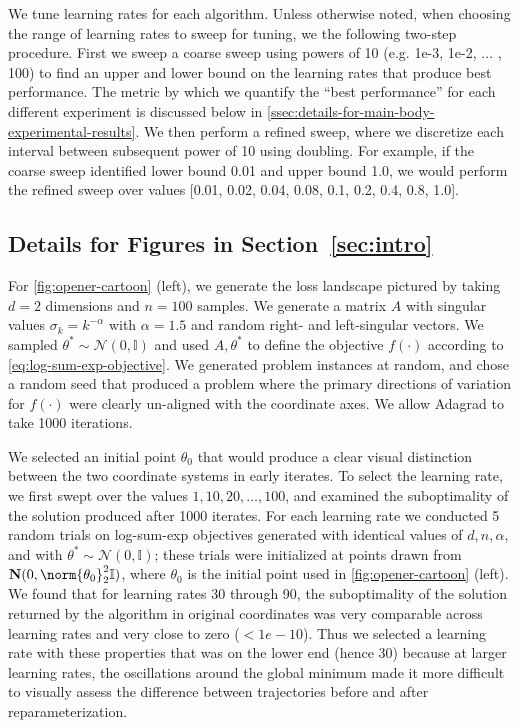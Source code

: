 We tune learning rates for each algorithm. Unless otherwise noted, when choosing the range of learning rates to sweep for tuning, we the following two-step procedure. First we sweep a coarse sweep using powers of 10 (e.g. 1e-3, 1e-2, $\dots$ , 100) to find an upper and lower bound on the learning rates that produce best performance. The metric by which we quantify the ``best performance'' for each different experiment is discussed below in \cref{ssec:details-for-main-body-experimental-results}. We then perform a refined sweep, where we discretize each interval between subsequent power of 10 using doubling. For example, if the coarse sweep identified lower bound 0.01 and upper bound 1.0, we would perform the refined sweep over values [0.01, 0.02, 0.04, 0.08, 0.1, 0.2, 0.4, 0.8, 1.0].

\subsection{Details for Figures in Section~\ref{sec:intro}}\label{ssec:details-for-opener-cartoon}

For \cref{fig:opener-cartoon} (left), we generate the loss landscape pictured by taking $d=2$ dimensions and $n=100$ samples. We generate a matrix $A$ with singular values $\sigma_k = k^{-\alpha}$ with $\alpha = 1.5$ and random right- and left-singular vectors. We sampled $\theta^* \sim \mathcal{N}(0, \mathbb{I})$ and used $A, \theta^*$ to define the objective $f(\cdot)$ according to \cref{eq:log-sum-exp-objective}. We generated problem instances at random, and chose a random seed that produced a problem where the primary directions of variation for $f(\cdot)$ were clearly un-aligned with the coordinate axes. We allow Adagrad to take 1000 iterations.

We selected an initial point $\theta_0$ that would produce a clear visual distinction between the two coordinate systems in early iterates. To select the learning rate, we first swept over the values $1, 10, 20,\dots, 100$, and examined the suboptimality of the solution produced after 1000 iterates. For each learning rate we conducted 5 random trials on log-sum-exp objectives generated with identical values of $d, n, \alpha$, and with $\theta^*\sim \mathcal{N}(0,\mathbb{I})$; these trials were initialized at points drawn from $\mathbf{N}(0, \norm{\theta_0}^2_2\mathbb{I})$, where $\theta_0$ is the initial point used in \cref{fig:opener-cartoon} (left). We found that for learning rates 30 through 90, the suboptimality of the solution returned by the algorithm in original coordinates was very comparable across learning rates and very close to zero ($<1e-10$). Thus we selected a learning rate with these properties that was on the lower end (hence 30) because at larger learning rates, the oscillations around the global minimum made it more difficult to visually assess the difference between trajectories before and after reparameterization.


